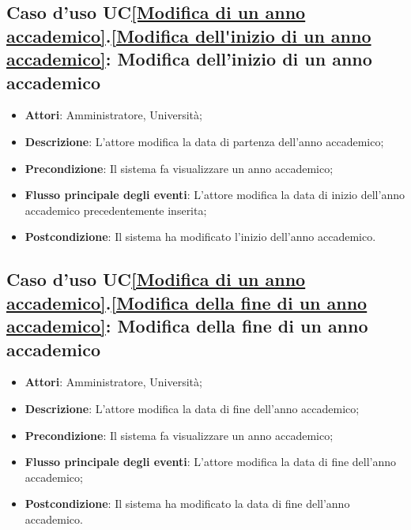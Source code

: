 \subsection{Caso d'uso UC\ref{Modifica di un anno accademico}.\ref{Modifica dell'inizio di un anno accademico}: Modifica dell'inizio di un anno accademico}
\begin{itemize}
	\item \textbf{Attori}: Amministratore, Università;
	\item \textbf{Descrizione}: L'attore modifica la data di partenza dell'anno accademico;
	\item \textbf{Precondizione}: Il sistema fa visualizzare un anno accademico;
	\item \textbf{Flusso principale degli eventi}: L'attore modifica la data di inizio dell'anno accademico precedentemente inserita;
	\item \textbf{Postcondizione}: Il sistema ha modificato l'inizio dell'anno accademico.
\end{itemize}

\subsection{Caso d'uso UC\ref{Modifica di un anno accademico}.\ref{Modifica della fine di un anno accademico}: Modifica della fine di un anno accademico}
\begin{itemize}
	\item \textbf{Attori}: Amministratore, Università;
	\item \textbf{Descrizione}: L'attore modifica la data di fine dell'anno accademico;
	\item \textbf{Precondizione}: Il sistema fa visualizzare un anno accademico;
	\item \textbf{Flusso principale degli eventi}: L'attore modifica la data di fine dell'anno accademico;
	\item \textbf{Postcondizione}: Il sistema ha modificato la data di fine dell'anno accademico.
\end{itemize}

